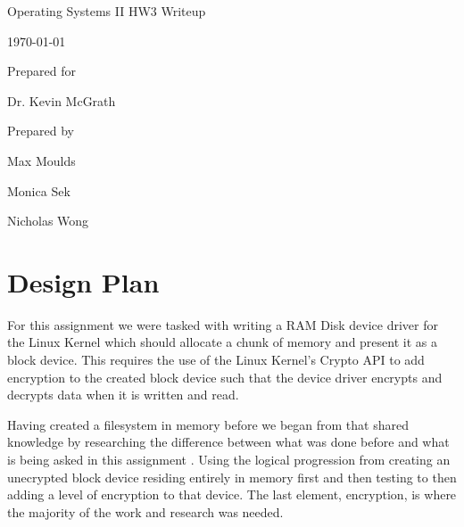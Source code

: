 \documentclass[onecolumn, draftclsnofoot,10pt, compsoc]{IEEEtran}
\def \GroupMemberOne{     Max Moulds}
\def \GroupMemberTwo{     Monica Sek}
\def \GroupMemberThree{     Nicholas Wong}
\def \ProfessorPerson{    Dr. Kevin McGrath}
\def \DocType{    HW3 Writeup
        }
\newcommand{\NameSigPair}[1]{\par
\makebox[2.75in][r]{#1} \hfil   \makebox[3.25in]{\makebox[2.25in]{\hrulefill} \hfill    \makebox[.75in]{\hrulefill}}
\par\vspace{-12pt} \textit{\tiny\noindent
\makebox[2.75in]{} \hfil    \makebox[3.25in]{\makebox[2.25in][r]{Signature} \hfill  \makebox[.75in][r]{Date}}}}
\begin{document}
\begin{titlepage}
    \begin{singlespace}
        \hfill
        \par\vspace{.2in}
        \centering
        \scshape{
            \huge Operating Systems II \DocType \par
            {\large\today}\par
            \vspace{.5in}
            \vfill
            \vspace{5pt}
            {\large Prepared for }\par
            \ProfessorPerson\par
            {\large Prepared by }\par
            \GroupMemberOne\par
            \GroupMemberTwo\par
            \GroupMemberThree\par
            \vspace{5pt}
            \vspace{20pt}
        }
        \begin{abstract}
          This document is the writeup for homework 3 of Operating Systems II Spring term 2018, written by Group 20.
          \end{abstract}
    \end{singlespace}
\end{titlepage}
\newpage
{}
\tableofcontents
\clearpage

\section{Design Plan}
For this assignment we were tasked with writing a RAM Disk device driver for the Linux Kernel which should allocate a chunk of memory and present it as a block device. This requires the use of the Linux Kernel's Crypto API to add encryption to the created block device such that the device driver encrypts and decrypts data when it is written and read.

Having created a filesystem in memory before we began from that shared knowledge by researching the difference between what was done before and what is being asked in this assignment \cite{jamescoyle}. Using the logical progression from creating an unecrypted block device residing entirely in memory first and then testing to then adding a level of encryption to that device. The last element, encryption, is where the majority of the work and research was needed. 
\end{document}
